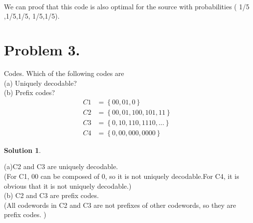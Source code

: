 \documentclass[UTF8,oneside]{article}
\newtheorem*{Solution}{Solution}
\begin{document}
\begin{center}
\\
We can proof that this code is also optimal for the source with probabilities ( 1/5 ,1/5,1/5, 1/5,1/5).
\end{center}


\section*{Problem 3.}
Codes. Which of the following codes are\\
(a) Uniquely decodable?\\
(b) Prefix codes?\\
\begin{align*}
C1 &= \left\{00, 01, 0\right\} \\C2 &= \left\{00, 01, 100, 101, 11\right\} \\C3& = \left\{0, 10, 110, 1110, ...\right\} \\C4& = \left\{0, 00, 000, 0000\right\}
\end{align*}
\begin{Solution}
\end{Solution}
(a)C2 and C3 are uniquely decodable.\\
(For C1, 00 can be composed of 0, so it is not uniquely decodable.For C4, it is obvious that it is not uniquely decodable.)\\

(b) C2 and C3 are prefix codes.\\
(All codewords in C2 and C3 are not prefixes of other codewords, so they are prefix codes. )
\end{document}
